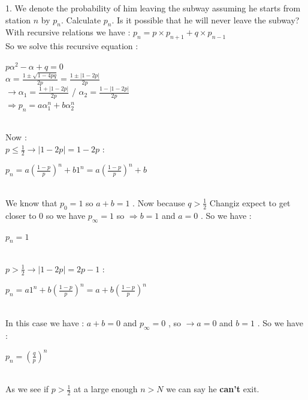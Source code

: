 \documentclass[30pt]{article}
\begin{document}
{\color{blue} {\large 1. }We denote the probability of him leaving the subway assuming he starts from station $n$ by $p_n$. Calculate $p_n$. Is it possible that he will never leave the subway? } \\ \newline
With recursive relations we have : \hspace{0.1cm} $p_n = p\times p_{n+1} + q\times p_{n-1} $ \\
So we solve this recursive equation : \\ 
\begin{center}
    $p\alpha^2 - \alpha + q = 0  $ \vspace{0.2cm} \\ 
    $\alpha = \frac{1 \pm \sqrt{1 - 4pq}}{2p} = \frac{1 \pm |1 - 2p|}{2p} $ \vspace{0.2cm} \\
    $\rightarrow \alpha_1 = \frac{1 + |1 - 2p|}{2p}  $ / $ \alpha_2 = \frac{1 - |1 - 2p|}{2p} $ \vspace{0.2cm} \\
    $\Rightarrow p_n = a\alpha_1^n + b \alpha_2^n $ 
\end{center} \\ 
Now : \\
$p \le \frac{1}{2} \rightarrow |1 - 2p| = 1 - 2p $ : \\ 
\begin{center}
    $p_n = a (\frac{1-p}{p})^n + b 1^n  = a (\frac{1-p}{p})^n + b $
\end{center} \\ 
We know that $p_0 = 1$ so $a+b = 1 $ . Now because $q>\frac{1}{2} $ Changiz expect to get closer to 0 so we have $p_{\infty} = 1 $ so $\Rightarrow b = 1 $ and $a = 0 $ . So we have : \\
\begin{center}
    $p_n = 1 $
\end{center} \\
$p > \frac{1}{2} \rightarrow |1 - 2p| = 2p - 1 $ : \\
\begin{center}
    $p_n = a 1^n + b(\frac{1-p}{p})^n = a + b(\frac{1-p}{p})^n  $
\end{center} \\ 
In this case we have : $a+b = 0 $ and $p_{\infty} = 0 $ , so $\rightarrow a = 0 $ and $b = 1 $ . So we  have : \\
\begin{center}
    $p_n = (\frac{q}{p})^n $
\end{center} \\
As we see if $p > \frac{1}{2} $ at a large enough $n > N$ we can say he \textbf{can't} exit. \\ \newline 
\end{document}
